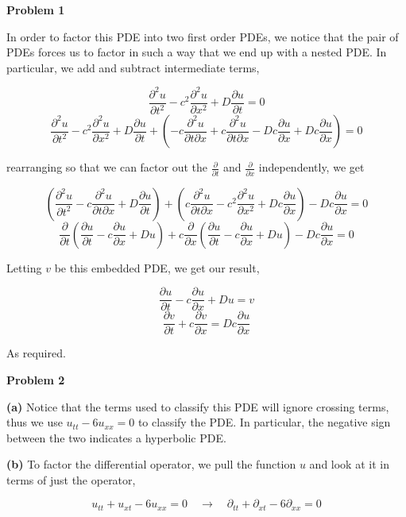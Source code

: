 \documentclass[10pt]{article}
\begin{document}
\textbf{Problem 1}

In order to factor this PDE into two first order PDEs, we notice that the pair of PDEs forces us to factor in such a way that we end up with a nested PDE. In particular, we add and subtract intermediate terms,

$$\frac{\partial^{2}u}{\partial t^{2}} - c^{2}\frac{\partial^{2}u}{\partial x^{2}} + D\frac{\partial u}{\partial t} = 0$$
$$\frac{\partial^{2}u}{\partial t^{2}} - c^{2}\frac{\partial^{2}u}{\partial x^{2}} + D\frac{\partial u}{\partial t} + \left(- c\frac{\partial^{2}u}{\partial t\partial x} + c\frac{\partial^{2}u}{\partial t\partial x} - Dc\frac{\partial u}{\partial x} + Dc\frac{\partial u}{\partial x}\right) = 0$$

rearranging so that we can factor out the $\frac{\partial}{\partial t}$ and $\frac{\partial}{\partial x}$ independently, we get

$$\left(\frac{\partial^{2}u}{\partial t^{2}} - c\frac{\partial^{2}u}{\partial t\partial x} +  D\frac{\partial u}{\partial t}\right) + \left(c\frac{\partial^{2}u}{\partial t\partial x} - c^{2}\frac{\partial^{2}u}{\partial x^{2}}+ Dc\frac{\partial u}{\partial x}\right) -  Dc\frac{\partial u}{\partial x}  = 0$$
$$\frac{\partial}{\partial t}\left(\frac{\partial u}{\partial t} - c\frac{\partial u}{\partial x} +  Du\right) + c\frac{\partial}{\partial x}\left(\frac{\partial u}{\partial t} - c\frac{\partial u}{\partial x}+ Du\right) -  Dc\frac{\partial u}{\partial x}  = 0$$

Letting $v$ be this embedded PDE, we get our result,

$$\frac{\partial u}{\partial t} - c\frac{\partial u}{\partial x} +  Du = v$$
$$\frac{\partial v}{\partial t} + c\frac{\partial v}{\partial x} = Dc\frac{\partial u}{\partial x}$$

As required.

\newpage

\textbf{Problem 2}

\textbf{(a)}
Notice that the terms used to classify this PDE will ignore crossing terms, thus we use $u_{tt} - 6u_{xx} = 0$ to classify the PDE. In particular, the negative sign between the two indicates a hyperbolic PDE.

\textbf{(b)}
To factor the differential operator, we pull the function $u$ and look at it in terms of just the operator,

$$u_{tt} + u_{xt} -6u_{xx} = 0 \hspace{1em} \to \hspace{1em} \partial_{tt} + \partial_{xt} - 6 \partial_{xx} = 0$$
\end{document}
